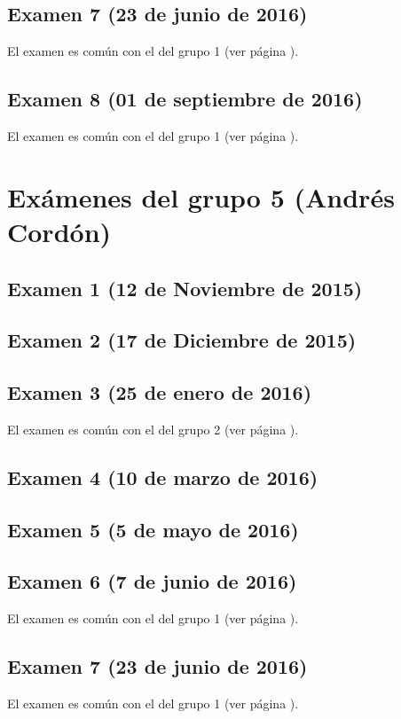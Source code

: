 \documentclass[a4paper,12pt,twoside]{book}
\begin{document}
\subsection{Examen 7 (23 de junio de 2016)}
El examen es común con el del grupo 1 (ver página \pageref{examen_15_16_4_7}).
\subsection{Examen 8 (01 de septiembre de 2016)}
El examen es común con el del grupo 1 (ver página \pageref{examen_15_16_4_8}).

\section{Exámenes del grupo 5 (Andrés Cordón)}
\subsection{Examen 1 (12 de Noviembre de 2015)}
\subsection{Examen 2 (17 de Diciembre de 2015)}
\subsection{Examen 3 (25 de enero de 2016)}
El examen es común con el del grupo 2 (ver página \pageref{examen_15_16_2_3}).
\subsection{Examen 4 (10 de marzo de 2016)}
\subsection{Examen 5 (5 de mayo de 2016)}
\subsection{Examen 6 (7 de junio de 2016)}
El examen es común con el del grupo 1 (ver página \pageref{examen_15_16_4_6}).
\subsection{Examen 7 (23 de junio de 2016)}
El examen es común con el del grupo 1 (ver página \pageref{examen_15_16_4_7}).
\end{document}
